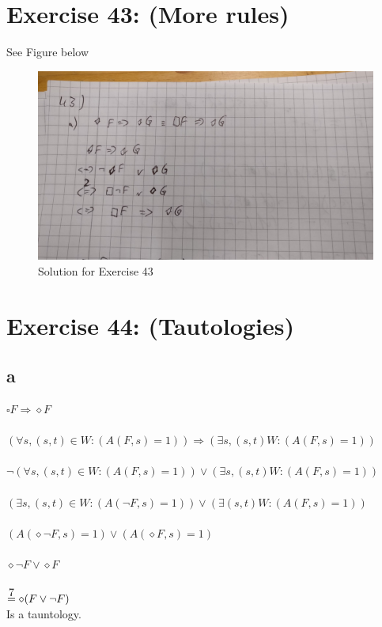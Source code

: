 \documentclass[12pt]{article}
\newcommand\partseven{\stackrel{\mathclap{\normalfont\mbox{7}}}{=}}
\begin{document}
\section*{Exercise 43: (More rules)}

See Figure below

\begin{figure}[ht]
	\includegraphics[scale=0.25]{../pics/43a.jpeg}
	\caption{Solution for Exercise 43}
\end{figure}

\section*{Exercise 44: (Tautologies)}

\subsection*{a}
$\square F \Rightarrow \diamond F$\\\\
$(\forall s,(s,t)\in W:(A(F,s)=1)) \Rightarrow (\exists s,(s,t) W:(A(F,s)=1))$\\\\
$\lnot (\forall s,(s,t)\in W:(A(F,s)=1)) \lor (\exists s,(s,t) W:(A(F,s)=1)) $\\\\
$ (\exists s,(s,t)\in W:(A(\lnot F,s)=1)) \lor (\exists (s,t) W:(A(F,s)=1)) $\\\\
$(A(\diamond \lnot F, s)=1) \lor (A(\diamond F,s)=1)$\\\\
$\diamond \lnot F \lor \diamond F$\\\\
$\partseven \diamond (F \lor \lnot F) $\\
Is a tauntology.
\end{document}
